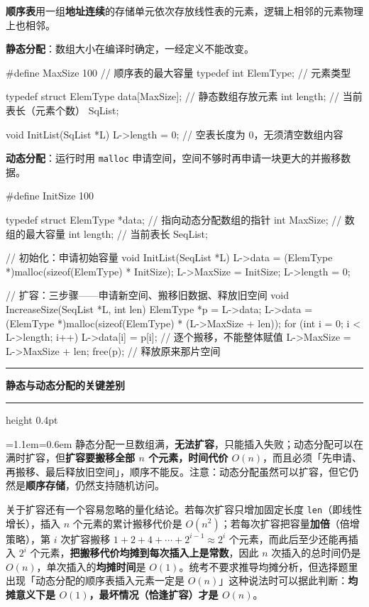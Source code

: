 \documentclass[11pt,openany,UTF8]{ctexbook}
\newcommand{\callouthead}[2]{%
  \par\addvspace{7pt}\noindent
  {\color{#1}\rule[-0.15em]{3pt}{1.05em}}\hspace{0.5em}%
  {\bfseries\color{#1}#2}\par\nobreak\vspace{-0.35em}%
  {\color{rulesep}\hrule height 0.4pt}\nobreak\vspace{0.45em}%
  \begingroup\small\setlength{\parindent}{0pt}%
  \leftskip=1.1em\rightskip=0.6em\noindent\ignorespaces}
\newcommand{\calloutend}{\par\endgroup\addvspace{7pt}}
\newenvironment{callwarn}[1]{\callouthead{warnbar}{#1}}{\calloutend}
\begin{document}
\textbf{顺序表}用一组\textbf{地址连续}的存储单元依次存放线性表的元素，逻辑上相邻的元素物理上也相邻。

\textbf{静态分配}：数组大小在编译时确定，一经定义不能改变。

\begin{codebox}
#define MaxSize 100        // 顺序表的最大容量
typedef int ElemType;      // 元素类型

typedef struct {
    ElemType data[MaxSize]; // 静态数组存放元素
    int length;             // 当前表长（元素个数）
} SqList;

void InitList(SqList *L) {
    L->length = 0;          // 空表长度为 0，无须清空数组内容
}
\end{codebox}

\textbf{动态分配}：运行时用 \texttt{malloc} 申请空间，空间不够时再申请一块更大的并搬移数据。

\begin{codebox}
#define InitSize 100

typedef struct {
    ElemType *data;  // 指向动态分配数组的指针
    int MaxSize;     // 数组的最大容量
    int length;      // 当前表长
} SeqList;

// 初始化：申请初始容量
void InitList(SeqList *L) {
    L->data = (ElemType *)malloc(sizeof(ElemType) * InitSize);
    L->MaxSize = InitSize;
    L->length = 0;
}

// 扩容：三步骤——申请新空间、搬移旧数据、释放旧空间
void IncreaseSize(SeqList *L, int len) {
    ElemType *p = L->data;
    L->data = (ElemType *)malloc(sizeof(ElemType) * (L->MaxSize + len));
    for (int i = 0; i < L->length; i++) {
        L->data[i] = p[i];        // 逐个搬移，不能整体赋值
    }
    L->MaxSize = L->MaxSize + len;
    free(p);                      // 释放原来那片空间
}
\end{codebox}

\begin{callwarn}{静态与动态分配的关键差别}
静态分配一旦数组满，\textbf{无法扩容}，只能插入失败；动态分配可以在满时扩容，但\textbf{扩容要搬移全部 $n$ 个元素，时间代价 $O(n)$}，而且必须「先申请、再搬移、最后释放旧空间」，顺序不能反。注意：动态分配虽然可以扩容，但它仍然是\textbf{顺序存储}，仍然支持随机访问。

\end{callwarn}

关于扩容还有一个容易忽略的量化结论。若每次扩容只增加固定长度 \texttt{len}（即线性增长），插入 $n$ 个元素的累计搬移代价是 $O(n^2)$；若每次扩容把容量\textbf{加倍}（倍增策略），第 $i$ 次扩容搬移 $1+2+4+\cdots+2^{i-1} \approx 2^i$ 个元素，而此后至少还能再插入 $2^i$ 个元素，\textbf{把搬移代价均摊到每次插入上是常数}，因此 $n$ 次插入的总时间仍是 $O(n)$，单次插入的\textbf{均摊时间}是 $O(1)$。统考不要求推导均摊分析，但选择题里出现「动态分配的顺序表插入元素一定是 $O(n)$」这种说法时可以据此判断：\textbf{均摊意义下是 $O(1)$，最坏情况（恰逢扩容）才是 $O(n)$}。
\end{document}
